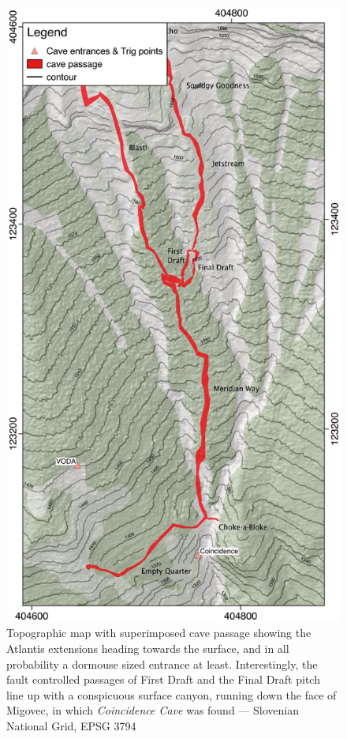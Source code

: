\begin{figure}[t!]
\checkoddpage \ifoddpage \forcerectofloat \else \forceversofloat \fi
\centering
\includegraphics[width=\textwidth]{images/2015/tanguy-meridian-2015/meridian_map.pdf}
\caption{Topographic map with superimposed cave passage showing the Atlantis extensions heading towards the surface, and in all probability a dormouse sized entrance at least. Interestingly, the fault controlled passages of First Draft and the Final Draft pitch line up with a conspicuous surface canyon, running down the face of Migovec, in which \emph{Coincidence Cave} was found --- Slovenian National Grid, EPSG 3794}
\label{meridian  map}
\end{figure}


